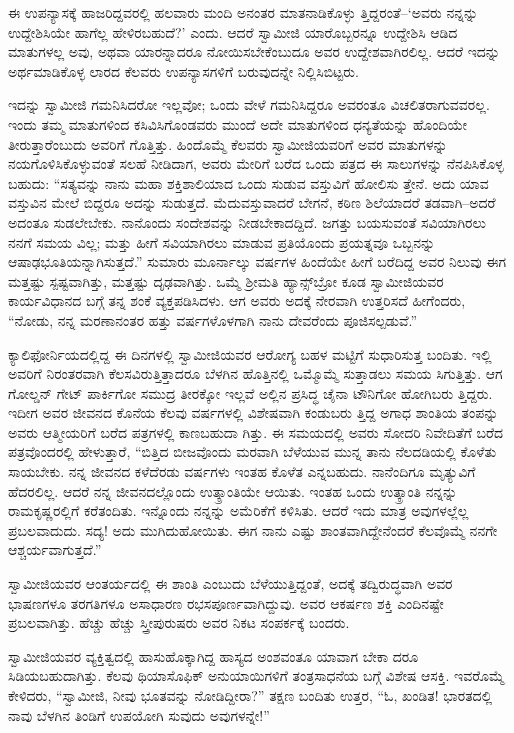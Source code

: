 ಈ ಉಪನ್ಯಾಸಕ್ಕೆ ಹಾಜರಿದ್ದವರಲ್ಲಿ ಹಲವಾರು ಮಂದಿ ಅನಂತರ ಮಾತನಾಡಿಕೊಳ್ಳು ತ್ತಿದ್ದರಂತೆ–‘ಅವರು ನನ್ನನ್ನು ಉದ್ದೇಶಿಸಿಯೇ ಹಾಗೆಲ್ಲ ಹೇಳಿರಬಹುದೆ?’ ಎಂದು. ಆದರೆ ಸ್ವಾಮೀಜಿ ಯಾರೊಬ್ಬರನ್ನೂ ಉದ್ದೇಶಿಸಿ ಆಡಿದ ಮಾತುಗಳಲ್ಲ ಅವು, ಅಥವಾ ಯಾರನ್ನಾದರೂ ನೋಯಿಸಬೇಕೆಂಬುದೂ ಅವರ ಉದ್ದೇಶವಾಗಿರಲಿಲ್ಲ. ಆದರೆ ಇದನ್ನು ಅರ್ಥಮಾಡಿಕೊಳ್ಳ ಲಾರದ ಕೆಲವರು ಉಪನ್ಯಾಸಗಳಿಗೆ ಬರುವುದನ್ನೇ ನಿಲ್ಲಿಸಿಬಿಟ್ಟರು.

ಇದನ್ನು ಸ್ವಾಮೀಜಿ ಗಮನಿಸಿದರೋ ಇಲ್ಲವೋ; ಒಂದು ವೇಳೆ ಗಮನಿಸಿದ್ದರೂ ಅವರಂತೂ ವಿಚಲಿತರಾಗುವವರಲ್ಲ. ಇಂದು ತಮ್ಮ ಮಾತುಗಳಿಂದ ಕಸಿವಿಸಿಗೊಂಡವರು ಮುಂದೆ ಅದೇ ಮಾತುಗಳಿಂದ ಧನ್ಯತೆಯನ್ನು ಹೊಂದಿಯೇ ತೀರುತ್ತಾರೆಂಬುದು ಅವರಿಗೆ ಗೊತ್ತಿತ್ತು. ಹಿಂದೊಮ್ಮೆ ಕೆಲವರು ಸ್ವಾಮೀಜಿಯವರಿಗೆ ಅವರ ಮಾತುಗಳನ್ನು ನಯಗೊಳಿಸಿಕೊಳ್ಳುವಂತೆ ಸಲಹೆ ನೀಡಿದಾಗ, ಅವರು ಮೇರಿಗೆ ಬರೆದ ಒಂದು ಪತ್ರದ ಈ ಸಾಲುಗಳನ್ನು ನೆನಪಿಸಿಕೊಳ್ಳ ಬಹುದು: “ಸತ್ಯವನ್ನು ನಾನು ಮಹಾ ಶಕ್ತಿಶಾಲಿಯಾದ ಒಂದು ಸುಡುವ ವಸ್ತುವಿಗೆ ಹೋಲಿಸು ತ್ತೇನೆ. ಅದು ಯಾವ ವಸ್ತುವಿನ ಮೇಲೆ ಬಿದ್ದರೂ ಅದನ್ನು ಸುಡುತ್ತದೆ. ಮೆದುವಸ್ತುವಾದರೆ ಬೇಗನೆ, ಕಠಿಣ ಶಿಲೆಯಾದರೆ ತಡವಾಗಿ–ಅದರೆ ಅದಂತೂ ಸುಡಲೇಬೇಕು. ನಾನೊಂದು ಸಂದೇಶವನ್ನು ನೀಡಬೇಕಾದದ್ದಿದೆ. ಜಗತ್ತು ಬಯಸುವಂತೆ ಸವಿಯಾಗಿರಲು ನನಗೆ ಸಮಯ ವಿಲ್ಲ; ಮತ್ತು ಹೀಗೆ ಸವಿಯಾಗಿರಲು ಮಾಡುವ ಪ್ರತಿಯೊಂದು ಪ್ರಯತ್ನವೂ ಒಬ್ಬನನ್ನು ಆಷಾಢಭೂತಿಯನ್ನಾಗಿಸುತ್ತದೆ.” ಸುಮಾರು ಮೂರ್ನಾಲ್ಕು ವರ್ಷಗಳ ಹಿಂದೆಯೇ ಹೀಗೆ ಬರೆದಿದ್ದ ಅವರ ನಿಲುವು ಈಗ ಮತ್ತಷ್ಟು ಸ್ಪಷ್ಟವಾಗಿತ್ತು, ಮತ್ತಷ್ಟು ದೃಢವಾಗಿತ್ತು. ಒಮ್ಮೆ ಶ್ರೀಮತಿ ಹ್ಯಾನ್ಸ್​ಬ್ರೋ ಕೂಡ ಸ್ವಾಮೀಜಿಯವರ ಕಾರ್ಯವಿಧಾನದ ಬಗ್ಗೆ ತನ್ನ ಶಂಕೆ ವ್ಯಕ್ತಪಡಿಸಿದಳು. ಆಗ ಅವರು ಅದಕ್ಕೆ ನೇರವಾಗಿ ಉತ್ತರಿಸದೆ ಹೀಗೆಂದರು, “ನೋಡು, ನನ್ನ ಮರಣಾನಂತರ ಹತ್ತು ವರ್ಷಗಳೊಳಗಾಗಿ ನಾನು ದೇವರೆಂದು ಪೂಜಿಸಲ್ಪಡುವೆ.”

ಕ್ಯಾಲಿಫೋರ್ನಿಯದಲ್ಲಿದ್ದ ಈ ದಿನಗಳಲ್ಲಿ ಸ್ವಾಮೀಜಿಯವರ ಆರೋಗ್ಯ ಬಹಳ ಮಟ್ಟಿಗೆ ಸುಧಾರಿಸುತ್ತ ಬಂದಿತು. ಇಲ್ಲಿ ಅವರಿಗೆ ನಿರಂತರವಾಗಿ ಕೆಲಸವಿರುತ್ತಿತ್ತಾದರೂ ಬೆಳಗಿನ ಹೊತ್ತಿನಲ್ಲಿ ಒಮ್ಮೊಮ್ಮೆ ಸುತ್ತಾಡಲು ಸಮಯ ಸಿಗುತ್ತಿತ್ತು. ಆಗ ಗೋಲ್ಡನ್ ಗೇಟ್ ಪಾರ್ಕಿಗೋ ಸಮುದ್ರ ತೀರಕ್ಕೋ ಇಲ್ಲವೆ ಅಲ್ಲಿನ ಪ್ರಸಿದ್ಧ ಚೈನಾ ಟೌನಿಗೋ ಹೋಗಿಬರು ತ್ತಿದ್ದರು. ಇದೀಗ ಅವರ ಜೀವನದ ಕೊನೆಯ ಕೆಲವು ವರ್ಷಗಳಲ್ಲಿ ವಿಶೇಷವಾಗಿ ಕಂಡುಬರು ತ್ತಿದ್ದ ಅಗಾಧ ಶಾಂತಿಯ ತಂಪನ್ನು ಅವರು ಆತ್ಮೀಯರಿಗೆ ಬರೆದ ಪತ್ರಗಳಲ್ಲಿ ಕಾಣಬಹುದಾ ಗಿತ್ತು. ಈ ಸಮಯದಲ್ಲಿ ಅವರು ಸೋದರಿ ನಿವೇದಿತೆಗೆ ಬರೆದ ಪತ್ರವೊಂದರಲ್ಲಿ ಹೇಳುತ್ತಾರೆ, “ಬಿತ್ತಿದ ಬೀಜವೊಂದು ಮರವಾಗಿ ಬೆಳೆಯುವ ಮುನ್ನ ತಾನು ನೆಲದಡಿಯಲ್ಲಿ ಕೊಳೆತು ಸಾಯಬೇಕು. ನನ್ನ ಜೀವನದ ಕಳೆದೆರಡು ವರ್ಷಗಳು ಇಂತಹ ಕೊಳೆತ ಎನ್ನಬಹುದು. ನಾನೆಂದಿಗೂ ಮೃತ್ಯುವಿಗೆ ಹೆದರಲಿಲ್ಲ. ಆದರೆ ನನ್ನ ಜೀವನದಲ್ಲೊಂದು ಉತ್ಕ್ರಾಂತಿಯೇ ಆಯಿತು. ಇಂತಹ ಒಂದು ಉತ್ಕ್ರಾಂತಿ ನನ್ನನ್ನು ರಾಮಕೃಷ್ಣರಲ್ಲಿಗೆ ಕರೆತಂದಿತು. ಇನ್ನೊಂದು ನನ್ನನ್ನು ಅಮೆರಿಕೆಗೆ ಕಳಿಸಿತು. ಆದರೆ ಇದು ಮಾತ್ರ ಅವುಗಳಲ್ಲೆಲ್ಲ ಪ್ರಬಲವಾದುದು. ಸದ್ಯ! ಅದು ಮುಗಿದುಹೋಯಿತು. ಈಗ ನಾನು ಎಷ್ಟು ಶಾಂತವಾಗಿದ್ದೇನೆಂದರೆ ಕೆಲವೊಮ್ಮೆ ನನಗೇ ಆಶ್ಚರ್ಯವಾಗುತ್ತದೆ.”

ಸ್ವಾಮೀಜಿಯವರ ಆಂತರ್ಯದಲ್ಲಿ ಈ ಶಾಂತಿ ಎಂಬುದು ಬೆಳೆಯುತ್ತಿದ್ದಂತೆ, ಅದಕ್ಕೆ ತದ್ವಿರುದ್ಧವಾಗಿ ಅವರ ಭಾಷಣಗಳೂ ತರಗತಿಗಳೂ ಅಸಾಧಾರಣ ರಭಸಪೂರ್ಣವಾಗಿದ್ದುವು. ಅವರ ಆಕರ್ಷಣ ಶಕ್ತಿ ಎಂದಿನಷ್ಟೇ ಪ್ರಬಲವಾಗಿತ್ತು. ಹೆಚ್ಚು ಹೆಚ್ಚು ಸ್ತ್ರೀಪುರುಷರು ಅವರ ನಿಕಟ ಸಂಪರ್ಕಕ್ಕೆ ಬಂದರು.

ಸ್ವಾಮೀಜಿಯವರ ವ್ಯಕ್ತಿತ್ವದಲ್ಲಿ ಹಾಸುಹೊಕ್ಕಾಗಿದ್ದ ಹಾಸ್ಯದ ಅಂಶವಂತೂ ಯಾವಾಗ ಬೇಕಾ ದರೂ ಸಿಡಿಯಬಹುದಾಗಿತ್ತು. ಕೆಲವು ಥಿಯಾಸೊಫಿಕ್ ಅನುಯಾಯಿಗಳಿಗೆ ತಂತ್ರಸಾಧನೆಯ ಬಗ್ಗೆ ವಿಶೇಷ ಆಸಕ್ತಿ. ಇವರೊಮ್ಮೆ ಕೇಳಿದರು, “ಸ್ವಾಮೀಜಿ, ನೀವು ಭೂತವನ್ನು ನೋಡಿದ್ದೀರಾ?” ತಕ್ಷಣ ಬಂದಿತು ಉತ್ತರ, “ಓ, ಖಂಡಿತ! ಭಾರತದಲ್ಲಿ ನಾವು ಬೆಳಗಿನ ತಿಂಡಿಗೆ ಉಪಯೋಗಿ ಸುವುದು ಅವುಗಳನ್ನೇ!”

